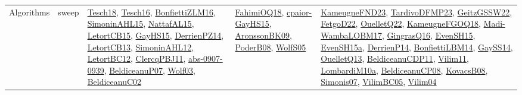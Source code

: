 {\begin{longtable}{lp{3cm}>{\raggedright}p{6cm}>{\raggedright}p{6cm}p{8cm}}
Algorithms & sweep & \href{papers/Tesch18.pdf}{Tesch18}\cite{Tesch18}, \href{papers/Tesch16.pdf}{Tesch16}\cite{Tesch16}, \href{papers/BonfiettiZLM16.pdf}{BonfiettiZLM16}\cite{BonfiettiZLM16}, \href{articles/SimoninAHL15.pdf}{SimoninAHL15}\cite{SimoninAHL15}, \href{articles/NattafAL15.pdf}{NattafAL15}\cite{NattafAL15}, \href{articles/LetortCB15.pdf}{LetortCB15}\cite{LetortCB15}, \href{papers/GayHS15.pdf}{GayHS15}\cite{GayHS15}, \href{papers/DerrienPZ14.pdf}{DerrienPZ14}\cite{DerrienPZ14}, \href{papers/LetortCB13.pdf}{LetortCB13}\cite{LetortCB13}, \href{papers/SimoninAHL12.pdf}{SimoninAHL12}\cite{SimoninAHL12}, \href{papers/LetortBC12.pdf}{LetortBC12}\cite{LetortBC12}, \href{papers/ClercqPBJ11.pdf}{ClercqPBJ11}\cite{ClercqPBJ11}, \href{articles/abs-0907-0939.pdf}{abs-0907-0939}\cite{abs-0907-0939}, \href{papers/BeldiceanuP07.pdf}{BeldiceanuP07}\cite{BeldiceanuP07}, \href{papers/Wolf03.pdf}{Wolf03}\cite{Wolf03}, \href{papers/BeldiceanuC02.pdf}{BeldiceanuC02}\cite{BeldiceanuC02} & \href{articles/FahimiOQ18.pdf}{FahimiOQ18}\cite{FahimiOQ18}, \href{papers/cpaior-GayHS15.pdf}{cpaior-GayHS15}\cite{cpaior-GayHS15}, \href{papers/AronssonBK09.pdf}{AronssonBK09}\cite{AronssonBK09}, \href{papers/PoderB08.pdf}{PoderB08}\cite{PoderB08}, \href{papers/WolfS05.pdf}{WolfS05}\cite{WolfS05} & \href{papers/KameugneFND23.pdf}{KameugneFND23}\cite{KameugneFND23}, \href{papers/TardivoDFMP23.pdf}{TardivoDFMP23}\cite{TardivoDFMP23}, \href{papers/GeitzGSSW22.pdf}{GeitzGSSW22}\cite{GeitzGSSW22}, \href{articles/FetgoD22.pdf}{FetgoD22}\cite{FetgoD22}, \href{papers/OuelletQ22.pdf}{OuelletQ22}\cite{OuelletQ22}, \href{papers/KameugneFGOQ18.pdf}{KameugneFGOQ18}\cite{KameugneFGOQ18}, \href{papers/Madi-WambaLOBM17.pdf}{Madi-WambaLOBM17}\cite{Madi-WambaLOBM17}, \href{papers/GingrasQ16.pdf}{GingrasQ16}\cite{GingrasQ16}, \href{papers/EvenSH15.pdf}{EvenSH15}\cite{EvenSH15}, \href{articles/EvenSH15a.pdf}{EvenSH15a}\cite{EvenSH15a}, \href{papers/DerrienP14.pdf}{DerrienP14}\cite{DerrienP14}, \href{articles/BonfiettiLBM14.pdf}{BonfiettiLBM14}\cite{BonfiettiLBM14}, \href{papers/GaySS14.pdf}{GaySS14}\cite{GaySS14}, \href{papers/OuelletQ13.pdf}{OuelletQ13}\cite{OuelletQ13}, \href{articles/BeldiceanuCDP11.pdf}{BeldiceanuCDP11}\cite{BeldiceanuCDP11}, \href{papers/Vilim11.pdf}{Vilim11}\cite{Vilim11}, \href{articles/LombardiM10a.pdf}{LombardiM10a}\cite{LombardiM10a}, \href{papers/BeldiceanuCP08.pdf}{BeldiceanuCP08}\cite{BeldiceanuCP08}, \href{articles/KovacsB08.pdf}{KovacsB08}\cite{KovacsB08}, \href{articles/Simonis07.pdf}{Simonis07}\cite{Simonis07}, \href{articles/VilimBC05.pdf}{VilimBC05}\cite{VilimBC05}, \href{papers/Vilim04.pdf}{Vilim04}\cite{Vilim04}\\

\end{longtable}}
